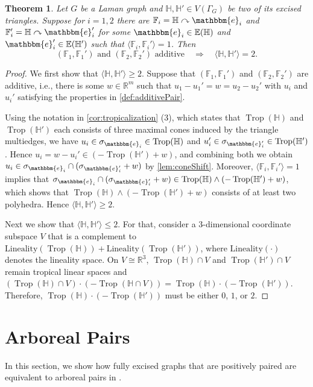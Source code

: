 \documentclass[11pt,reqno,a4paper]{amsart}
\theoremstyle{theoremstyle}
\newtheorem{theorem}{Theorem}[section]
\theoremstyle{examplestyle}
\theoremstyle{algorithmstyle}
\newcommand{\EE}{\mathbb{E}}
\newcommand{\ee}{\mathbbm{e}}
\newcommand{\FF}{\mathbb{F}}
\newcommand{\HH}{\mathbb{H}}
\newcommand{\RR}{\mathbb{R}}
\DeclareMathOperator{\Trop}{Trop}
\begin{document}
\begin{theorem}
  \label{thm:additive}
  Let $G$ be a Laman graph and $\HH,\HH'\in V(\Gamma_G)$ be two of its excised triangles. Suppose for $i=1,2$ there are $\FF_i=\HH\curvearrowright\ee_i$ and $\FF_i'=\HH\curvearrowright\ee_i'$ for some $\ee_i\in \EE(\HH)$ and $\ee_i'\in\EE(\HH')$ such that $\langle \FF_i,\FF_i'\rangle=1$.  Then
  \begin{equation*}
    (\FF_1,\FF_1') \text{ and } (\FF_2,\FF_2') \text{ additive} \quad \Longrightarrow \quad \langle \HH,\HH'\rangle = 2.
  \end{equation*}
\end{theorem}
\begin{proof}
  We first show that $\langle \HH,\HH'\rangle\geq 2$.
  Suppose that $(\FF_1,\FF_1')$ and $(\FF_2,\FF_2')$ are additive, i.e., there is some $w\in\RR^m$ such that $u_1 - u_1' = w = u_2 - u_2'$ with $u_i$ and $u_i'$ satisfying the properties in \cref{def:additivePair}.

  Using the notation in \cref{cor:tropicalization} (3), which states that $\Trop(\HH)$ and $\Trop(\HH')$ each consists of three maximal cones induced by the triangle multiedges, we have $u_i\in\sigma_{\ee_i}\in\Trop(\HH)$ and $u_i'\in\sigma_{\ee_i'}\in\Trop(\HH')$.  Hence $u_i=w-u_i'\in (-\Trop(\HH')+w)$, and combining both we obtain $u_i\in \sigma_{\ee_i}\cap(\sigma_{\ee_i'}+w)$ by \cref{lem:coneShift}.  Moreover, $\langle \FF_i,\FF_i'\rangle=1$ implies that $\sigma_{\ee_i}\cap(\sigma_{\ee_i'}+w)\in \Trop(\HH)\wedge(-\Trop(\HH')+w)$, which shows that $\Trop(\HH)\wedge(-\Trop(\HH')+w)$ consists of at least two polyhedra.  Hence $\langle \HH,\HH'\rangle\geq 2$.

  Next we show that $\langle \HH,\HH'\rangle\leq 2$.  For that, consider a $3$-dimensional coordinate subspace $V$ that is a complement to $\mathrm{Lineality}(\Trop(\HH))+\mathrm{Lineality}(\Trop(\HH'))$, where $\mathrm{Lineality}(\cdot)$ denotes the lineality space.  On $V\cong\RR^3$, $\Trop(\HH)\cap V$ and $\Trop(\HH')\cap V$ remain tropical linear spaces and $(\Trop(\HH)\cap V)\cdot (-\Trop(\HH\cap V))=\Trop(\HH)\cdot(-\Trop(\HH'))$.  Therefore, $\Trop(\HH)\cdot(-\Trop(\HH'))$ must be either $0$, $1$, or $2$.
\end{proof}



\section{Arboreal Pairs}\label{sec:arboreal}
In this section, we show how fully excised graphs that are positively paired are equivalent to arboreal pairs in \cite{Ardila-MantillaEurPenaguiao2024}.
\end{document}
